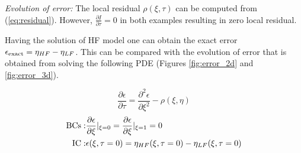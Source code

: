 \documentclass[]{article}
\begin{document}
\textit{Evolution of error:}
The local residual $\rho(\xi,\tau)$ can be computed from (\ref{eq:residual}). However, $\frac{\partial I}{\partial \tau} = 0 $ in both examples
resulting in zero local residual.


Having the solution of HF model one can obtain the exact error $\epsilon_{\rm exact} = \eta_{HF} - \eta_{LF}$. This can be compared with
the evolution of error that is obtained from solving the following PDE (Figures \ref{fig:error_2d} and \ref{fig:error_3d}).

\begin{equation*}
\frac{\partial\epsilon}{\partial\tau} = \frac{\partial^2\epsilon}{\partial\xi^2} -\rho(\xi,\eta)
\end{equation*}
%
\begin{eqnarray}
{\rm BCs:} & \frac{\partial\epsilon}{\partial\xi}|_{\xi=0} = \frac{\partial\epsilon}{\partial\xi}|_{\xi=1} = 0\\
{\rm IC:} & \epsilon(\xi,\tau=0) = \eta_{HF}(\xi,\tau=0) - \eta_{LF}(\xi,\tau=0)
\end{eqnarray}
%
\end{document}
